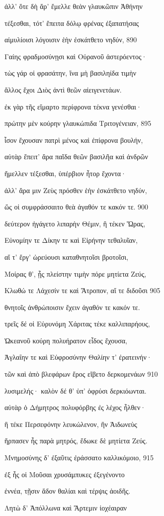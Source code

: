 ἀλλ' ὅτε δὴ ἄρ' ἔμελλε θεὰν γλαυκῶπιν Ἀθήνην

τέξεσθαι, τότ' ἔπειτα δόλῳ φρένας ἐξαπατήσας

αἱμυλίοισι λόγοισιν ἑὴν ἐσκάτθετο νηδύν, 890 

Γαίης φραδμοσύνῃσι καὶ Οὐρανοῦ ἀστερόεντος· 

τὼς γάρ οἱ φρασάτην, ἵνα μὴ βασιληίδα τιμὴν

ἄλλος ἔχοι Διὸς ἀντὶ θεῶν αἰειγενετάων.

ἐκ γὰρ τῆς εἵμαρτο περίφρονα τέκνα γενέσθαι· 

πρώτην μὲν κούρην γλαυκώπιδα Τριτογένειαν, 895

ἶσον ἔχουσαν πατρὶ μένος καὶ ἐπίφρονα βουλήν,

αὐτὰρ ἔπειτ' ἄρα παῖδα θεῶν βασιλῆα καὶ ἀνδρῶν

ἤμελλεν τέξεσθαι, ὑπέρβιον ἦτορ ἔχοντα·

ἀλλ' ἄρα μιν Ζεὺς πρόσθεν ἑὴν ἐσκάτθετο νηδύν,

ὥς οἱ συμφράσσαιτο θεὰ ἀγαθόν τε κακόν τε. 900

δεύτερον ἠγάγετο λιπαρὴν Θέμιν, ἣ τέκεν Ὥρας,

Εὐνομίην τε Δίκην τε καὶ Εἰρήνην τεθαλυῖαν,

αἵ τ' ἔργ' ὠρεύουσι καταθνητοῖσι βροτοῖσι,

Μοίρας θ', ᾗς πλείστην τιμὴν πόρε μητίετα Ζεύς, 

Κλωθώ τε Λάχεσίν τε καὶ Ἄτροπον, αἵ τε διδοῦσι 905 

θνητοῖς ἀνθρώποισιν ἔχειν ἀγαθόν τε κακόν τε.

τρεῖς δέ οἱ Εὐρυνόμη Χάριτας τέκε καλλιπαρήους,

Ὠκεανοῦ κούρη πολυήρατον εἶδος ἔχουσα,

Ἀγλαΐην τε καὶ Εὐφροσύνην Θαλίην τ' ἐρατεινήν·

τῶν καὶ ἀπὸ βλεφάρων ἔρος εἴβετο δερκομενάων 910

λυσιμελής· καλὸν δέ θ' ὑπ' ὀφρύσι δερκιόωνται. 

αὐτὰρ ὁ Δήμητρος πολυφόρβης ἐς λέχος ἦλθεν· 

ἣ τέκε Περσεφόνην λευκώλενον, ἣν Ἀιδωνεὺς

ἥρπασεν ἧς παρὰ μητρός, ἔδωκε δὲ μητίετα Ζεύς. 

Μνημοσύνης δ' ἐξαῦτις ἐράσσατο καλλικόμοιο, 915 

ἐξ ἧς οἱ Μοῦσαι χρυσάμπυκες ἐξεγένοντο

ἐννέα, τῇσιν ἅδον θαλίαι καὶ τέρψις ἀοιδῆς.

Λητὼ δ' Ἀπόλλωνα καὶ Ἄρτεμιν ἰοχέαιραν 


